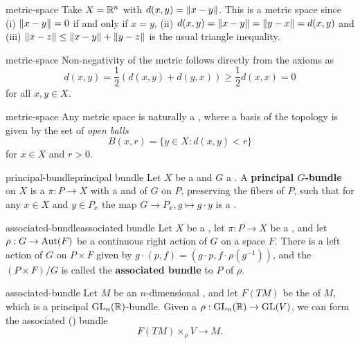 \begin{example}{metric-space}
    Take $X = \mathbb{R}^n$ with $d(x, y) = \left\|x - y\right\|$. This is a metric space since (i) $\left\|x - y\right\| = 0$ if and only if $x = y$, (ii) $d(x, y) = \left\|x - y\right\| = \left\|y - x\right\| = d(x, y)$ and (iii) $\left\|x - z\right\| \le \left\|x - y\right\| + \left\|y - z\right\|$ is the usual triangle inequality.
\end{example}

\begin{example}{metric-space}
    Non-negativity of the metric follows directly from the axioms as
    \[ d(x, y) = \frac{1}{2} (d(x, y) + d(y, x)) \ge \frac{1}{2} d(x, x) = 0 \]
    for all $x, y \in X$.
\end{example}

\begin{example}{metric-space}
    Any metric space is naturally a , where a basis of the topology is given by the set of \textit{open balls}
    \[ B(x, r) = \{ y \in X : d(x, y) < r \} \]
    for $x \in X$ and $r > 0$.
\end{example}

\begin{topic}{principal-bundle}{principal bundle}
    Let $X$ be a  and $G$ a . A \textbf{principal $G$-bundle} on $X$ is a  $\pi : P \to X$ with a  and   of $G$ on $P$, preserving the fibers of $P$, such that for any $x \in X$ and $y \in P_x$ the map $G \to P_x, g \mapsto g \cdot y$ is a .
\end{topic}

\begin{topic}{associated-bundle}{associated bundle}
    Let $X$ be a , let $\pi : P \to X$ be a , and let $\rho : G \to \textup{Aut}(F)$ be a continuous right action of $G$ on a space $F$. There is a left action of $G$ on $P \times F$ given by $g \cdot (p, f) = (g \cdot p, f \cdot \rho(g^{-1}))$, and the  $(P \times F) / G$ is called the \textbf{associated bundle} to $P$ of $\rho$.
\end{topic}

\begin{example}{associated-bundle}
    Let $M$ be an $n$-dimensional , and let $F(TM)$ be the  of $M$, which is a principal $\textup{GL}_n(\mathbb{R})$-bundle. Given a  $\rho : \textup{GL}_n(\mathbb{R}) \to \textup{GL}(V)$, we can form the associated () bundle
    \[ F(TM) \times_\rho V \to M . \]
\end{example}

